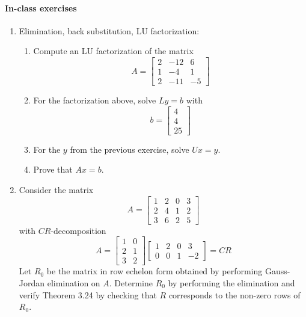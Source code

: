 \documentclass{article}
\begin{document}
\paragraph{In-class exercises}

\begin{enumerate}
\item Elimination, back substitution, LU factorization:
\begin{enumerate}
    \item Compute an LU factorization of the matrix
    $$
    A = \begin{bmatrix}
        2 & -12 & 6 \\
        1 & -4 & 1 \\
        2 & -11 & -5
    \end{bmatrix}
    $$
    \item For the factorization above, solve $Ly = b$ with
    $$
    b = \begin{bmatrix}
        4 \\ 4 \\ 25
    \end{bmatrix}
    $$
    \item For the $y$ from the previous exercise, solve $Ux = y$.
    \item Prove that $Ax = b$.
\end{enumerate}
\item Consider the matrix
    $$
    A = \begin{bmatrix}
        1 & 2 & 0 & 3 \\
        2 & 4 & 1 & 2 \\
        3 & 6 & 2 & 5
    \end{bmatrix}
    $$
    with $CR$-decomposition
    $$
    A = \begin{bmatrix}
        1 & 0 \\ 2 & 1 \\ 3 & 2
    \end{bmatrix}\begin{bmatrix}
        1 & 2 & 0 & 3 \\
        0 & 0 & 1 & -2
    \end{bmatrix} = CR
    $$
    Let $R_0$ be the matrix in row echelon form obtained by performing Gauss-Jordan elimination on $A$. Determine $R_0$ by performing the elimination and verify Theorem 3.24 by checking that $R$ corresponds to the non-zero rows of $R_0$.
\end{enumerate}
\end{document}
